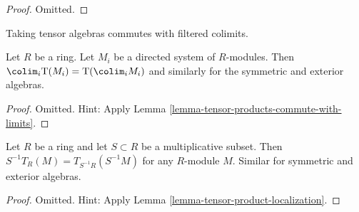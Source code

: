 \begin{proof}
Omitted.
\end{proof}

\begin{lemma}
\label{lemma-colimit-tensor-algebra}
\begin{slogan}
Taking tensor algebras commutes with filtered colimits.
\end{slogan}
Let $R$ be a ring. Let $M_i$ be a directed system of
$R$-modules. Then
$\colim_i \text{T}(M_i) = \text{T}(\colim_i M_i)$
and similarly for the symmetric and exterior algebras.
\end{lemma}

\begin{proof}
Omitted. Hint: Apply Lemma \ref{lemma-tensor-products-commute-with-limits}.
\end{proof}

\begin{lemma}
\label{lemma-tensor-algebra-localization}
Let $R$ be a ring and let $S \subset R$ be a multiplicative subset.
Then $S^{-1}T_R(M) = T_{S^{-1}R}(S^{-1}M)$ for any $R$-module $M$.
Similar for symmetric and exterior algebras.
\end{lemma}

\begin{proof}
Omitted. Hint: Apply Lemma \ref{lemma-tensor-product-localization}.
\end{proof}









